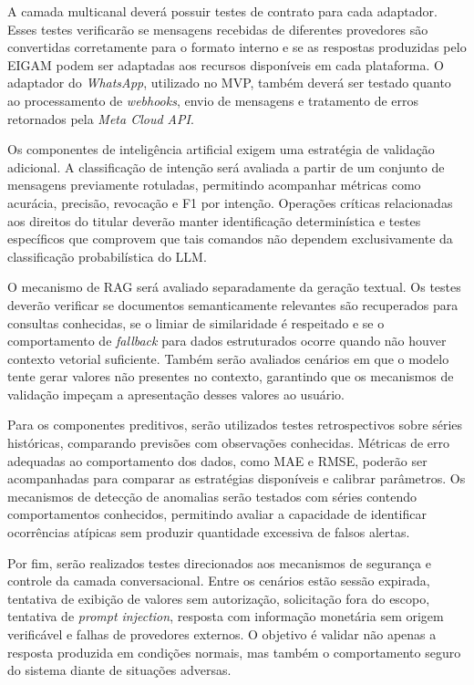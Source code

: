 A camada multicanal deverá possuir testes de contrato para cada adaptador. Esses testes verificarão se mensagens recebidas de diferentes provedores são convertidas corretamente para o formato interno e se as respostas produzidas pelo EIGAM podem ser adaptadas aos recursos disponíveis em cada plataforma. O adaptador do \textit{WhatsApp}, utilizado no MVP, também deverá ser testado quanto ao processamento de \textit{webhooks}, envio de mensagens e tratamento de erros retornados pela \textit{Meta Cloud API}.

Os componentes de inteligência artificial exigem uma estratégia de validação adicional. A classificação de intenção será avaliada a partir de um conjunto de mensagens previamente rotuladas, permitindo acompanhar métricas como acurácia, precisão, revocação e F1 por intenção. Operações críticas relacionadas aos direitos do titular deverão manter identificação determinística e testes específicos que comprovem que tais comandos não dependem exclusivamente da classificação probabilística do LLM.

O mecanismo de RAG será avaliado separadamente da geração textual. Os testes deverão verificar se documentos semanticamente relevantes são recuperados para consultas conhecidas, se o limiar de similaridade é respeitado e se o comportamento de \textit{fallback} para dados estruturados ocorre quando não houver contexto vetorial suficiente. Também serão avaliados cenários em que o modelo tente gerar valores não presentes no contexto, garantindo que os mecanismos de validação impeçam a apresentação desses valores ao usuário.

Para os componentes preditivos, serão utilizados testes retrospectivos sobre séries históricas, comparando previsões com observações conhecidas. Métricas de erro adequadas ao comportamento dos dados, como MAE e RMSE, poderão ser acompanhadas para comparar as estratégias disponíveis e calibrar parâmetros. Os mecanismos de detecção de anomalias serão testados com séries contendo comportamentos conhecidos, permitindo avaliar a capacidade de identificar ocorrências atípicas sem produzir quantidade excessiva de falsos alertas.

Por fim, serão realizados testes direcionados aos mecanismos de segurança e controle da camada conversacional. Entre os cenários estão sessão expirada, tentativa de exibição de valores sem autorização, solicitação fora do escopo, tentativa de \textit{prompt injection}, resposta com informação monetária sem origem verificável e falhas de provedores externos. O objetivo é validar não apenas a resposta produzida em condições normais, mas também o comportamento seguro do sistema diante de situações adversas.



